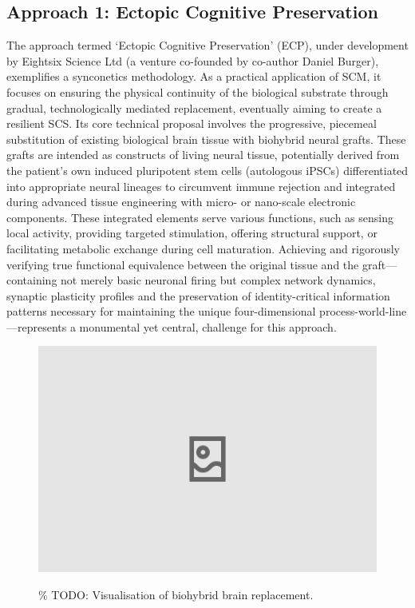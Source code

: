 \documentclass[10pt]{article}
\begin{document}
\begin{sloppypar}
  \subsection{Approach 1: Ectopic Cognitive Preservation}
  \label{sec:daniel-approach}

  The approach termed ‘Ectopic Cognitive Preservation’ (ECP), under development by Eightsix Science Ltd (a venture co-founded by co-author Daniel Burger), exemplifies a synconetics methodology. As a practical application of SCM, it focuses on ensuring the physical continuity of the biological substrate through gradual, technologically mediated replacement, eventually aiming to create a resilient SCS. Its core technical proposal involves the progressive, piecemeal substitution of existing biological brain tissue with biohybrid neural grafts. These grafts are intended as constructs of living neural tissue, potentially derived from the patient’s own induced pluripotent stem cells (autologous iPSCs) differentiated into appropriate neural lineages to circumvent immune rejection and integrated during advanced tissue engineering with micro- or nano-scale electronic components. These integrated elements serve various functions, such as sensing local activity, providing targeted stimulation, offering structural support, or facilitating metabolic exchange during cell maturation. Achieving and rigorously verifying true functional equivalence between the original tissue and the graft—containing not merely basic neuronal firing but complex network dynamics, synaptic plasticity profiles and the preservation of identity-critical information patterns necessary for maintaining the unique four-dimensional process-world-line—represents a monumental yet central, challenge for this approach.

  \begin{figure}[ht]
    \centering
    \includegraphics[width=\textwidth]{figures/ecp-brain-replacement.png}
    \label{fig:ecp-replacement}
    \caption{\% TODO: Visualisation of biohybrid brain replacement.}
  \end{figure}


\end{sloppypar}
\end{document}

